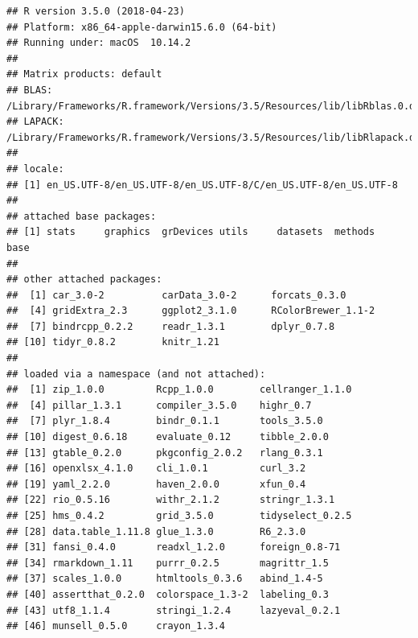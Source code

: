 \documentclass[]{article}
\begin{document}
\begin{verbatim}
## R version 3.5.0 (2018-04-23)
## Platform: x86_64-apple-darwin15.6.0 (64-bit)
## Running under: macOS  10.14.2
## 
## Matrix products: default
## BLAS: /Library/Frameworks/R.framework/Versions/3.5/Resources/lib/libRblas.0.dylib
## LAPACK: /Library/Frameworks/R.framework/Versions/3.5/Resources/lib/libRlapack.dylib
## 
## locale:
## [1] en_US.UTF-8/en_US.UTF-8/en_US.UTF-8/C/en_US.UTF-8/en_US.UTF-8
## 
## attached base packages:
## [1] stats     graphics  grDevices utils     datasets  methods   base     
## 
## other attached packages:
##  [1] car_3.0-2          carData_3.0-2      forcats_0.3.0     
##  [4] gridExtra_2.3      ggplot2_3.1.0      RColorBrewer_1.1-2
##  [7] bindrcpp_0.2.2     readr_1.3.1        dplyr_0.7.8       
## [10] tidyr_0.8.2        knitr_1.21        
## 
## loaded via a namespace (and not attached):
##  [1] zip_1.0.0         Rcpp_1.0.0        cellranger_1.1.0 
##  [4] pillar_1.3.1      compiler_3.5.0    highr_0.7        
##  [7] plyr_1.8.4        bindr_0.1.1       tools_3.5.0      
## [10] digest_0.6.18     evaluate_0.12     tibble_2.0.0     
## [13] gtable_0.2.0      pkgconfig_2.0.2   rlang_0.3.1      
## [16] openxlsx_4.1.0    cli_1.0.1         curl_3.2         
## [19] yaml_2.2.0        haven_2.0.0       xfun_0.4         
## [22] rio_0.5.16        withr_2.1.2       stringr_1.3.1    
## [25] hms_0.4.2         grid_3.5.0        tidyselect_0.2.5 
## [28] data.table_1.11.8 glue_1.3.0        R6_2.3.0         
## [31] fansi_0.4.0       readxl_1.2.0      foreign_0.8-71   
## [34] rmarkdown_1.11    purrr_0.2.5       magrittr_1.5     
## [37] scales_1.0.0      htmltools_0.3.6   abind_1.4-5      
## [40] assertthat_0.2.0  colorspace_1.3-2  labeling_0.3     
## [43] utf8_1.1.4        stringi_1.2.4     lazyeval_0.2.1   
## [46] munsell_0.5.0     crayon_1.3.4
\end{verbatim}
\end{document}
